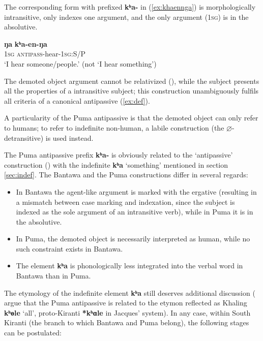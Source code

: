 \documentclass[oneside,a4paper,11pt]{article}
\newcommand{\ipa}[1]{{\phon\textbf{#1}}}
\begin{document}
The corresponding form with prefixed \ipa{kʰa-} in (\ref{ex:khaennga}) is morphologically intransitive, only indexes one argument, and the only argument (\textsc{1sg}) is in the absolutive. 

\begin{exe}
\ex \label{ex:khaennga}
\gll 
\ipa{ŋa} \ipa{kʰa-en-ŋa} \\
\textsc{1sg} \textsc{antipass}-hear-\textsc{1sg}:S/P \\
\glt `I hear someone/people.' (not `I hear something')
\end{exe}
 
The demoted object argument cannot be relativized (\citealt[10]{bickel07puma}), while the subject presents all the properties of a intransitive subject; this construction unambiguously fulfils all criteria of a canonical antipassive (\ref{ex:def}). 

A particularity of the Puma antipassive is that the demoted object can only refer to humans; to refer to indefinite non-human, a labile construction (the $\varnothing$-detransitive) is used instead.

The Puma antipassive prefix \ipa{kʰa-} is obviously related to the `antipassive' construction (\citealt[226;335]{doornenbal09}) with the indefinite \ipa{kʰa} `something' mentioned in section \ref{sec:indef}. The Bantawa and the Puma constructions differ in several regards:
\begin{itemize}
\item In Bantawa the agent-like argument is marked with the ergative (resulting in a mismatch between case marking and indexation, since the subject is indexed as the sole argument of an intransitive verb), while in Puma it is in the absolutive.
\item In Puma, the demoted object is necessarily interpreted as human, while no such constraint exists in Bantawa.
\item The element \ipa{kʰa} is phonologically less integrated into the verbal word in Bantawa than in Puma.
\end{itemize}

The etymology of the indefinite element \ipa{kʰa} still deserves additional discussion (\citealt[67]{bickel15antipassive} argue that the Puma antipassive is related to the etymon reflected as Khaling \ipa{kʰɵle} `all', proto-Kiranti \ipa{*kʰɑle} in Jacques' \citeyear{jacques17pkiranti} system). In any case, within South Kiranti (the branch to which Bantawa and Puma belong), the following stages can be postulated:
\end{document}
